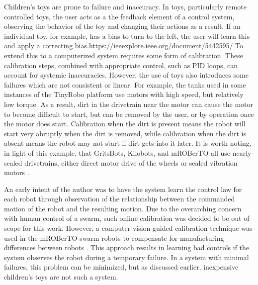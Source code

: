 \documentclass[]{article}
\begin{document}
Children's toys are prone to failure and inaccuracy.
In toys, particularly remote controlled toys, the user acts as a the feedback element of a control system, observing the behavior of the toy and changing their actions as a result. 
If an individual toy, for example, has a bias to turn to the left, the user will learn this and apply a correcting bias.https://ieeexplore.ieee.org/document/5442595/
To extend this to a computerized system requires some form of calibration. 
These calibration steps, combined with appropriate control, such as PID loops, can account for systemic inaccuracies. 
However, the use of toys also introduces some failures which are not consistent or linear. 
For example, the tanks used in some instances of the TinyRobo platform use motors with high speed, but relatively low torque. 
As a result, dirt in the drivetrain near the motor can cause the motor to become difficult to start, but can be removed by the user, or by operation once the motor does start. 
Calibration when the dirt is present means the robot will start very abruptly when the dirt is removed, while calibration when the dirt is absent means the robot may not start if dirt gets into it later. 
It is worth noting, in light of this example, that GritsBots, Kilobots, and mROBerTO all use nearly-sealed drivetrains, either direct motor drive of the wheels or sealed vibration motors \cite{rubenstein2014kilobot, Kim2016mROBerTOAM, pickem2015gritsbot}. 

An early intent of the author was to have the system learn the control law for each robot through observation of the relationship between the commanded motion of the robot and the resulting motion. 
Due to the overarching concern with human control of a swarm, such online calibration was decided to be out of scope for this work. 
However, a computer-vision-guided calibration technique was used in the mROBerTO swarm robots to compensate for manufacturing differences between robots \cite{Kim2016mROBerTOAM}. 
This approach results in learning bad controls if the system observes the robot during a temporary failure. 
In a system with minimal failures, this problem can be minimized, but as discussed earlier, inexpensive children's toys are not such a system. 
\end{document}
